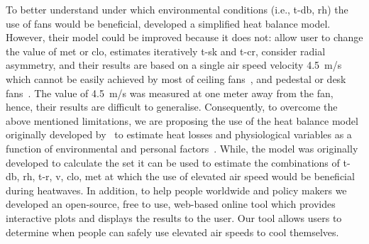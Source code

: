 To better understand under which environmental conditions (i.e., \ac{t-db}, \ac{rh}) the use of fans would be beneficial,  developed a simplified heat balance model.
However, their model could be improved because it does not: allow user to change the value of \ac{met} or \ac{clo}, estimates iteratively \ac{t-sk} and \ac{t-cr}, consider radial asymmetry, and their results are based on a single air speed velocity 4.5~m/s which cannot be easily achieved by most of ceiling fans~\cite{Raftery2019}, and pedestal or desk fans~\cite{Yang2015a}.
The value of 4.5~m/s was measured at one meter away from the fan, hence, their results are difficult to generalise.
Consequently, to overcome the above mentioned limitations, we are proposing the use of the heat balance model originally developed by~ to estimate heat losses and physiological variables as a function of environmental and personal factors~\cite{Gagge1986}.
While, the  model was originally developed to calculate the \ac{set} it can be used to estimate the combinations of \ac{t-db}, \ac{rh}, \ac{t-r}, \ac{v}, \ac{clo}, \ac{met} at which the use of elevated air speed would be beneficial during heatwaves.
In addition, to help people worldwide and policy makers we developed an open-source, free to use, web-based online tool which provides interactive plots and displays the results to the user.
Our tool allows users to determine when people can safely use elevated air speeds to cool themselves.